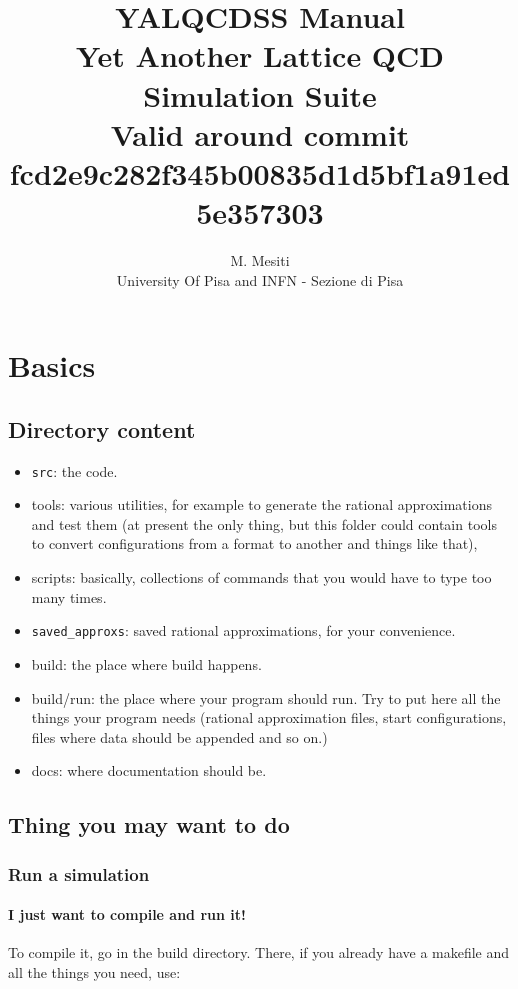 \documentclass[a4paper,10pt]{book}
\title{{\Huge \bf YALQCDSS Manual} \\
Yet Another Lattice QCD Simulation Suite \\
{\small Valid around commit 
fcd2e9c282f345b00835d1d5bf1a91ed5e357303}}
\author{M. Mesiti\\{\small University Of Pisa and INFN - Sezione di Pisa}}
\begin{document}
\maketitle
\date{}

\chapter{Basics}

 \section{Directory content}

  \begin{itemize}
   \item \texttt{src}: the code.
   \item tools: various utilities, for example to generate the rational
    approximations and test them (at present the only thing, but this
    folder could contain tools to convert configurations from a format to
    another and things like that), 
   \item scripts: basically, collections of commands that you would have to
    type too many times.
   \item \verb|saved_approxs|: saved rational approximations, for your 
convenience. 
   \item build: the place where build happens. 
   \item build/run: the place where your program should run. Try to put here
    all the things your program needs (rational approximation files,
    start configurations, files where data should be appended and so on.)
   \item docs: where documentation should be.
\end{itemize}


\section{Thing you may want to do}

\subsection{Run a simulation}
 
    

 \subsubsection{I just want to compile and run it!}
  To compile it, go in the build directory. There, if you already have
  a makefile and all the things you need, use: 
\end{document}
